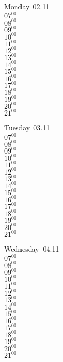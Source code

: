 \documentclass[11pt,a4paper]{book}\usepackage[]{graphicx}\usepackage[]{color}
\begin{document}
\begin{headerbox}
\end{headerbox}
\begin{weekdaybox}
  Monday~02.11\\
  { 
  \vfill
  $07^{00}$\\
$08^{00}$\\
$09^{00}$\\
$10^{00}$\\
$11^{00}$\\
$12^{00}$\\
$13^{00}$\\
$14^{00}$\\
$15^{00}$\\
$16^{00}$\\
$17^{00}$\\
$18^{00}$\\
$19^{00}$\\
$20^{00}$\\
$21^{00}$\\
  }
\end{weekdaybox}
\begin{weekdaybox}
  Tuesday~03.11\\
  { 
  \vfill
  $07^{00}$\\
$08^{00}$\\
$09^{00}$\\
$10^{00}$\\
$11^{00}$\\
$12^{00}$\\
$13^{00}$\\
$14^{00}$\\
$15^{00}$\\
$16^{00}$\\
$17^{00}$\\
$18^{00}$\\
$19^{00}$\\
$20^{00}$\\
$21^{00}$\\
  }
\end{weekdaybox}
\begin{weekdaybox}
  Wednesday~04.11\\
  { 
  \vfill
  $07^{00}$\\
$08^{00}$\\
$09^{00}$\\
$10^{00}$\\
$11^{00}$\\
$12^{00}$\\
$13^{00}$\\
$14^{00}$\\
$15^{00}$\\
$16^{00}$\\
$17^{00}$\\
$18^{00}$\\
$19^{00}$\\
$20^{00}$\\
$21^{00}$\\
  }
\end{weekdaybox}
\end{document}
